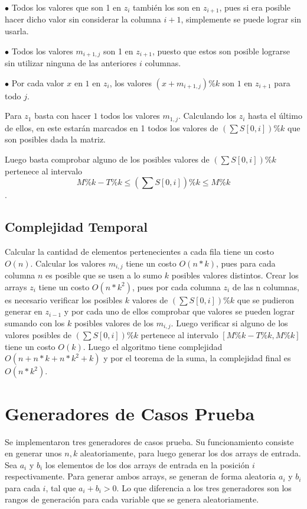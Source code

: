 \documentclass[article]{llncs}
\begin{document}
$\bullet $ Todos los valores que son 1 en $z_i$ también los son en $z_{i+1}$, pues si era posible hacer dicho valor sin considerar la columna $i+1$, simplemente se puede lograr sin usarla.

$\bullet $ Todos los valores $m_{i+1,j}$ son 1 en $z_{i+1}$, puesto que estos son posible lograrse sin utilizar ninguna de las anteriores $i$ columnas.

$\bullet $ Por cada valor $x$ en $1$ en $z_i$, los valores $(x+m_{i+1,j}) \% k$ son $1$ en $z_{i+1}$ para todo $j$.

Para $z_1$ basta con hacer $1$ todos los valores $m_{1,j}$. Calculando los $z_i$ hasta el último de ellos, en este estarán marcados en 1 todos los valores de $(\sum S[0,i])\%k$ que son posibles dada la matriz.

Luego basta comprobar alguno de los posibles valores de $(\sum S[0,i])\%k$ pertenece al intervalo $$M\%k - T\% k \leq (\sum S[0,i])\%k \leq M \% k$$.

\subsection{Complejidad Temporal}

Calcular la cantidad de elementos pertenecientes a cada fila tiene un costo $O(n)$. Calcular los valores $m_{i,j}$ tiene un costo $O(n*k)$, pues para cada columna $n$ es posible que se usen a lo sumo $k$ posibles valores distintos.
Crear los arrays $z_i$ tiene un costo $O(n*k^2)$, pues por cada columna $z_i$ de las n columnas, es necesario verificar los posibles $k$ valores
de $(\sum S[0,i])\%k$ que se pudieron generar en $z_{i-1}$ y por cada uno de ellos comprobar que valores se pueden lograr sumando con los $k$
posibles valores de los $m_{i,j}$. Luego verificar si alguno de los valores posibles de $(\sum S[0,i])\%k$ pertenece al intervalo $[M\%k - T\% k , M \% k]$ tiene un costo $O(k)$.
Luego el algoritmo 
tiene complejidad $O(n + n*k + n*k^2 + k)$ y por el teorema de la 
suma, la complejidad final es $O(n*k^2)$.

\section{Generadores de Casos Prueba}

Se implementaron tres generadores de casos prueba. Su funcionamiento 
consiste en generar unos $n,k$ aleatoriamente, para luego generar 
los dos arrays de entrada. Sea $a_i$ y $b_i$ los elementos de los dos arrays
de entrada en la posici\'on $i$ respectivamente. Para generar ambos arrays, 
se generan de forma aleatoria $a_i$ y $b_i$ para cada $i$, tal que 
$a_i + b_i > 0$.
Lo que diferencia a los tres generadores son los rangos de generaci\'on para 
cada variable que se genera aleatoriamente.
\end{document}
